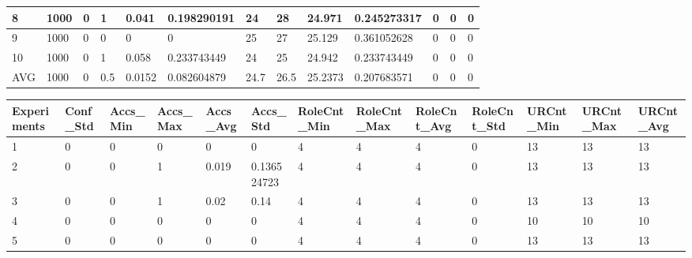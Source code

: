 \begin{table}[H]
\begin{adjustbox}{max width=480pt,keepaspectratio,angle=90}
\begin{tabular}{|l|l|l|l|l|l|l|l|l|l|l|l|l|}
					8           & 1000  & 0               & 1               & 0.041           & 0.198290191     & 24                 & 28                 & 24.971             & 0.245273317        & 0         & 0         & 0         \\ \hline
					9           & 1000  & 0               & 0               & 0               & 0               & 25                 & 27                 & 25.129             & 0.361052628        & 0         & 0         & 0         \\ \hline
					10          & 1000  & 0               & 1               & 0.058           & 0.233743449     & 24                 & 25                 & 24.942             & 0.233743449        & 0         & 0         & 0         \\ \hline
					AVG         & 1000  & 0               & 0.5             & 0.0152          & 0.082604879     & 24.7               & 26.5               & 25.2373            & 0.207683571        & 0         & 0         & 0         \\ \hline
				\end{tabular}
			\end{adjustbox}
			\begin{adjustbox}{max width=480pt,keepaspectratio,angle=90}
				\begin{tabular}{|l|l|l|l|l|l|l|l|l|l|l|l|l|}
					\hline
					\rowcolor[HTML]{EFEFEF} 
					Experiments & Conf\_Std & Accs\_Min & Accs\_Max & Accs\_Avg & Accs\_Std   & RoleCnt\_Min & RoleCnt\_Max & RoleCnt\_Avg & RoleCnt\_Std & URCnt\_Min & URCnt\_Max & URCnt\_Avg \\ \hline
					1           & 0         & 0         & 0         & 0         & 0           & 4            & 4            & 4            & 0            & 13         & 13         & 13         \\ \hline
					2           & 0         & 0         & 1         & 0.019     & 0.136524723 & 4            & 4            & 4            & 0            & 13         & 13         & 13         \\ \hline
					3           & 0         & 0         & 1         & 0.02      & 0.14        & 4            & 4            & 4            & 0            & 13         & 13         & 13         \\ \hline
					4           & 0         & 0         & 0         & 0         & 0           & 4            & 4            & 4            & 0            & 10         & 10         & 10         \\ \hline
					5           & 0         & 0         & 0         & 0         & 0           & 4            & 4            & 4            & 0            & 13         & 13         & 13         \\ \hline

\end{tabular}
\end{adjustbox}
\end{table}
